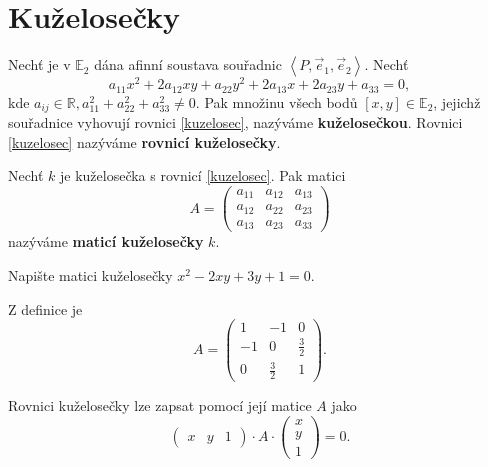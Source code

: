 \section{Kuželosečky}
\begin{definition}
    Nechť je v $\mathbb E_2$ dána afinní soustava souřadnic $\left < P,\vec e_1, \vec e_2 \right > $.
    Nechť
    \begin{equation}\label{kuzelosec}
        a_{11}x^2+2a_{12}xy+a_{22}y^2+2a_{13}x+2a_{23}y+a_{33}=0,
    \end{equation}
    kde $a_{ij}\in \mathbb R, a_{11}^2 + a_{22}^2 + a_{33}^2\ne 0.$ Pak množinu všech
    bodů $[x,y] \in \mathbb E_2$, jejichž souřadnice vyhovují rovnici \ref{kuzelosec},
    nazýváme \textbf{kuželosečkou}. Rovnici \ref{kuzelosec} nazýváme \textbf{rovnicí kuželosečky}.
\end{definition}

\begin{definition}
    Nechť $k$ je kuželosečka s rovnicí \ref{kuzelosec}. Pak matici
    $$
        A = \begin{pmatrix}
            a_{11} & a_{12} & a_{13} \\
            a_{12} & a_{22} & a_{23} \\
            a_{13} & a_{23} & a_{33}
        \end{pmatrix}
    $$
    nazýváme \textbf{maticí kuželosečky} $k$.
\end{definition}

\begin{priklad}
Napište matici kuželosečky $x^2-2xy+3y+1=0.$
\end{priklad}
\begin{reseni}
Z definice je
$$
A = \begin{pmatrix}
    1 &-1 &0\\
    -1 &0 &\frac{3}{2}\\
    0 &\frac{3}{2} &1
\end{pmatrix}.
$$
\end{reseni}

\begin{pozn}
    Rovnici kuželosečky lze zapsat pomocí její matice $A$ jako
    $$\begin{pmatrix}
        x & y & 1
    \end{pmatrix}\cdot A \cdot \begin{pmatrix}
        x\\
        y\\
        1
    \end{pmatrix}=0.$$
\end{pozn}

